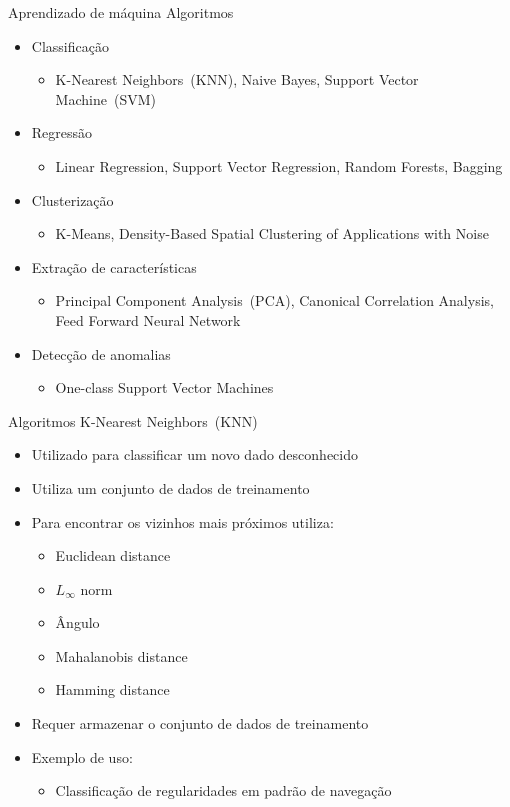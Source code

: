 \documentclass[t]{beamer}
\begin{document}
\begin{frame}{Aprendizado de máquina}
Algoritmos
\begin{itemize}
	\item Classificação
	\begin{itemize}
		\item K-Nearest Neighbors~(KNN), Naive Bayes, Support Vector Machine~(SVM)
	\end{itemize}
	\item Regressão
	\begin{itemize}
		\item Linear Regression, Support Vector Regression, Random Forests, Bagging
	\end{itemize}
	\item Clusterização
	\begin{itemize}
		\item K-Means, Density-Based Spatial Clustering of Applications with Noise
	\end{itemize}
	\item Extração de características
	\begin{itemize}
		\item Principal Component Analysis~(PCA), Canonical Correlation Analysis, Feed Forward Neural Network
	\end{itemize}
	\item Detecção de anomalias
	\begin{itemize}
		\item One-class Support Vector Machines
	\end{itemize}
\end{itemize}
\end{frame}

\begin{frame}{Algoritmos}
K-Nearest Neighbors~(KNN)
\begin{itemize}
	\item Utilizado para classificar um novo dado desconhecido
	\item Utiliza um conjunto de dados de treinamento
	\item Para encontrar os vizinhos mais próximos utiliza:
	\begin{itemize}
		\item Euclidean distance
		\item $L_\infty$ norm
		\item Ângulo
		\item Mahalanobis distance
		\item Hamming distance
	\end{itemize}
	\item Requer armazenar o conjunto de dados de treinamento
	\item Exemplo de uso:
	\begin{itemize}
		\item Classificação de regularidades em padrão de navegação
	\end{itemize}
\end{itemize}
\end{frame}
\end{document}
